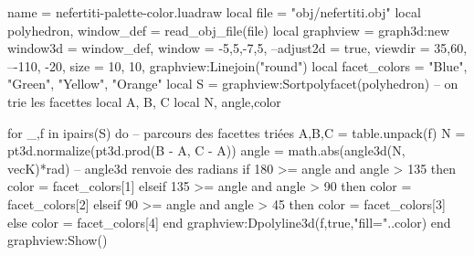 \begin{luadraw}{name = nefertiti-palette-color.luadraw}
local file = "obj/nefertiti.obj"
local polyhedron, window_def = read_obj_file(file)
local graphview = graph3d:new{
  window3d = window_def,
  window = {-5,5,-7,5},
  --adjust2d = true,
  viewdir  = {35,60}, --{-110, -20},
  size     = {10, 10},
}
graphview:Linejoin("round")
local facet_colors = {"Blue", "Green", "Yellow", "Orange"}
local S = graphview:Sortpolyfacet(polyhedron) -- on trie les facettes
local A, B, C
local N, angle,color

for _,f in ipairs(S) do  -- parcours des facettes triées
  A,B,C = table.unpack(f)
  N = pt3d.normalize(pt3d.prod(B - A, C - A))
  angle = math.abs(angle3d(N, vecK)*rad) -- angle3d renvoie des radians
  if 180 >= angle and angle > 135  then
    color = facet_colors[1]
  elseif 135 >= angle and angle > 90 then
    color = facet_colors[2]
  elseif 90 >= angle and angle > 45 then
    color = facet_colors[3]
  else
    color = facet_colors[4]
  end
  graphview:Dpolyline3d(f,true,"fill="..color)
end
graphview:Show()
\end{luadraw}
